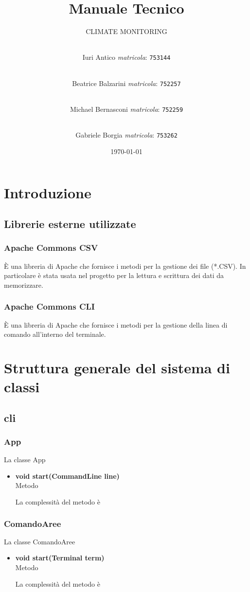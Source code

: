 \documentclass[a4paper, 12pt]{scrreprt}
\title {Manuale Tecnico}
\subtitle{CLIMATE MONITORING}
\author{
	\\Iuri Antico \textit{matricola}:
	\texttt{753144}
	\and \\
	Beatrice Balzarini \textit{matricola}:
	\texttt{752257}
	\and \\
	Michael Bernasconi \textit{matricola}:
	\texttt{752259}
	\and \\
	Gabriele Borgia \textit{matricola}:
	\texttt{753262}
}
\date{\today}
\begin{document}
	\maketitle

	\tableofcontents
	\listoffigures
	\listoftables

	\chapter{Introduzione}
		\section{Librerie esterne utilizzate}
			\subsection{Apache Commons CSV}
			\`E una libreria di Apache che fornisce i metodi per la gestione dei file (*.CSV). In particolare \`e stata usata nel progetto per la lettura e scrittura dei dati da memorizzare.
			\subsection{Apache Commons CLI}
			\`E una libreria di Apache che fornisce i metodi per la gestione della linea di comando all'interno del terminale.

	\chapter{Struttura generale del sistema di classi}
		\section{cli}
			\subsection{App}
			La classe App
			\begin{itemize}
				\item \textbf{void start(CommandLine line)}
				\\Metodo
				
				La complessit\`a del metodo è
				
			\end{itemize}
			
			\subsection{ComandoAree}
			La classe ComandoAree
			\begin{itemize}
				\item \textbf{void start(Terminal term)}
				\\Metodo
				
				La complessit\`a del metodo è
				
			\end{itemize}
\end{document}
